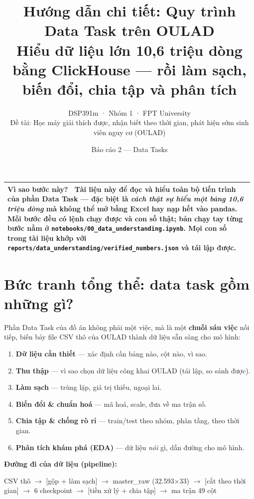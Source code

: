 \documentclass[11pt,a4paper]{article}
\title{\vspace{-1.2cm}\textbf{\color{themecol}Hướng dẫn chi tiết: Quy trình Data Task trên OULAD}\\[4pt]
\large Hiểu dữ liệu lớn \textbf{10,6 triệu dòng} bằng \textbf{ClickHouse} — rồi làm sạch, biến đổi, chia tập và phân tích}
\author{DSP391m · Nhóm 1 · FPT University \\ \small Đề tài: Học máy giải thích được, nhận biết theo thời gian, phát hiện sớm sinh viên nguy cơ (OULAD)}
\date{Báo cáo 2 — Data Tasks}
\makeatletter
\newenvironment{whybox}{%
  \par\smallskip\noindent\begin{tabular}{@{}p{0.985\linewidth}@{}}
  \arrayrulecolor{themecol}\hline\rule{0pt}{1.1em}\textbf{\color{themecol}Vì sao bước này?}\ \ignorespaces}{%
  \\\hline\end{tabular}\par\smallskip}
\makeatother
\begin{document}
\maketitle
\thispagestyle{fancy}

\begin{whybox}
Tài liệu này để \textbf{đọc và hiểu toàn bộ tiến trình} của phần Data Task — đặc biệt là
\textit{cách thật sự hiểu một bảng 10,6 triệu dòng} mà không thể mở bằng Excel hay nạp hết vào
pandas. Mỗi bước đều có \textbf{lệnh chạy được} và \textbf{con số thật}; bản chạy tay từng bước
nằm ở \texttt{notebooks/00\_data\_understanding.ipynb}. Mọi con số trong tài liệu khớp với
\texttt{reports/data\_understanding/verified\_numbers.json} và tái lập được.
\end{whybox}

\tableofcontents
\vspace{0.5em}

\section{Bức tranh tổng thể: data task gồm những gì?}
Phần Data Task của đồ án không phải một việc, mà là một \textbf{chuỗi sáu việc} nối tiếp, biến
bảy file CSV thô của OULAD thành dữ liệu sẵn sàng cho mô hình:

\begin{enumerate}[leftmargin=1.4em,itemsep=2pt]
  \item \textbf{Dữ liệu cần thiết} — xác định cần bảng nào, cột nào, vì sao.
  \item \textbf{Thu thập} — vì sao chọn dữ liệu công khai OULAD (tái lập, so sánh được).
  \item \textbf{Làm sạch} — trùng lặp, giá trị thiếu, ngoại lai.
  \item \textbf{Biến đổi \& chuẩn hoá} — mã hoá, scale, đưa về ma trận số.
  \item \textbf{Chia tập \& chống rò rỉ} — train/test theo nhóm, phân tầng, theo thời gian.
  \item \textbf{Phân tích khám phá (EDA)} — dữ liệu \textit{nói} gì, dẫn đường cho mô hình.
\end{enumerate}

\noindent\textbf{Đường đi của dữ liệu (pipeline):}
\begin{center}\small{} CSV thô $\rightarrow$ [gộp + làm sạch] $\rightarrow$ master\_raw (32.593$\times$33)
$\rightarrow$ [cắt theo thời gian] $\rightarrow$ 6 checkpoint
$\rightarrow$ [tiền xử lý + chia tập] $\rightarrow$ ma trận 49 cột
\end{center}
\end{document}

